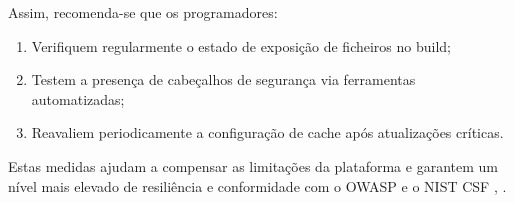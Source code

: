 Assim, recomenda-se que os programadores:

\begin{enumerate}

    \item Verifiquem regularmente o estado de exposição de ficheiros no build;

    \item Testem a presença de cabeçalhos de segurança via ferramentas automatizadas;

    \item Reavaliem periodicamente a configuração de cache após atualizações críticas.

\end{enumerate}

Estas medidas ajudam a compensar as limitações da plataforma e garantem um nível mais elevado de resiliência e conformidade com o OWASP e o NIST CSF \cite{ref2}, \cite{ref18}.
